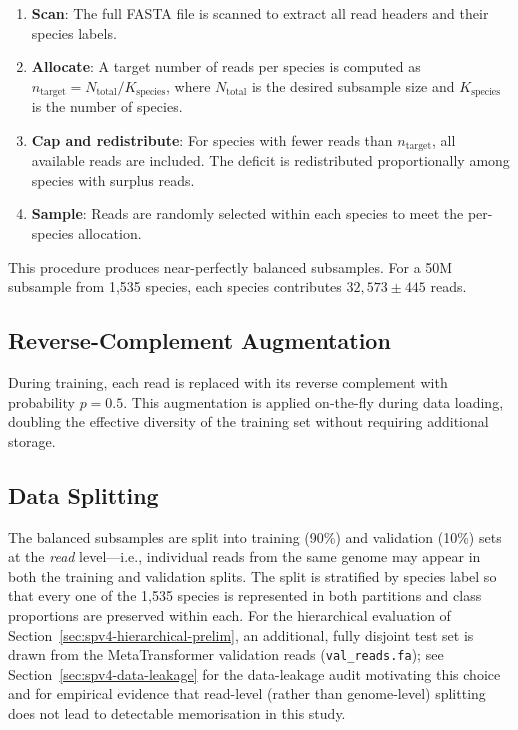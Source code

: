 \begin{enumerate}
    \item \textbf{Scan}: The full FASTA file is scanned to extract all read headers and their species labels.
    \item \textbf{Allocate}: A target number of reads per species is computed as $n_{\text{target}} = N_{\text{total}} / K_{\text{species}}$, where $N_{\text{total}}$ is the desired subsample size and $K_{\text{species}}$ is the number of species.
    \item \textbf{Cap and redistribute}: For species with fewer reads than $n_{\text{target}}$, all available reads are included. The deficit is redistributed proportionally among species with surplus reads.
    \item \textbf{Sample}: Reads are randomly selected within each species to meet the per-species allocation.
\end{enumerate}

This procedure produces near-perfectly balanced subsamples. For a 50M subsample from 1,535 species, each species contributes $32{,}573 \pm 445$ reads.

\subsection{Reverse-Complement Augmentation}

During training, each read is replaced with its reverse complement with probability $p = 0.5$. This augmentation is applied on-the-fly during data loading, doubling the effective diversity of the training set without requiring additional storage.

\subsection{Data Splitting}

The balanced subsamples are split into training (90\%) and validation (10\%) sets at the \emph{read} level---i.e., individual reads from the same genome may appear in both the training and validation splits.
The split is stratified by species label so that every one of the 1{,}535 species is represented in both partitions and class proportions are preserved within each.
For the hierarchical evaluation of Section~\ref{sec:spv4-hierarchical-prelim}, an additional, fully disjoint test set is drawn from the MetaTransformer validation reads (\texttt{val\_reads.fa}); see Section~\ref{sec:spv4-data-leakage} for the data-leakage audit motivating this choice and for empirical evidence that read-level (rather than genome-level) splitting does not lead to detectable memorisation in this study.


